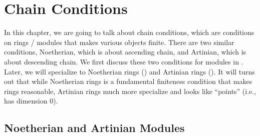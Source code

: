 \chapter{Chain Conditions}
In this chapter, we are going to talk about
chain conditions, which are conditions
on rings / modules that makes various objects finite.
There are two similar conditions, 
Noetherian, which is about ascending chain,
and Artinian, which is about descending chain.
We first discuss these two conditions for modules
in .
Later, we will specialize to Noetherian rings
()
and Artinian rings ().
It will turns out that while Noetherian
rings is a fundamental finiteness condition that makes
rings reasonable, Artinian rings much more specialize
and looks like ``points'' (i.e., has dimension $0$).

\section{Noetherian and Artinian Modules}
\label{sec:chain_modules}
